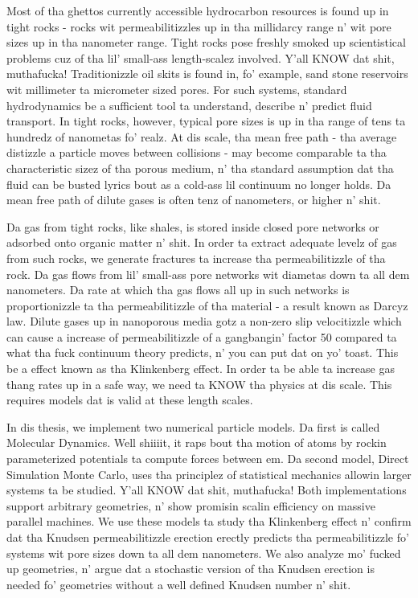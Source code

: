 Most of tha ghettos currently accessible hydrocarbon resources is found up in tight rocks - rocks wit permeabilitizzles up in tha millidarcy range n' wit pore sizes up in tha nanometer range. Tight rocks pose freshly smoked up scientistical problems cuz of tha lil' small-ass length-scalez involved. Y'all KNOW dat shit, muthafucka! Traditionizzle oil skits is found in, fo' example, sand stone reservoirs wit millimeter ta micrometer sized pores. For such systems, standard hydrodynamics be a sufficient tool ta understand, describe n' predict fluid transport. In tight rocks, however, typical pore sizes is up in tha range of tens ta hundredz of nanometas fo' realz. At dis scale, tha mean free path - tha average distizzle a particle moves between collisions - may become comparable ta tha characteristic sizez of tha porous medium, n' tha standard assumption dat tha fluid can be busted lyrics bout as a cold-ass lil continuum no longer holds. Da mean free path of dilute gases is often tenz of nanometers, or higher n' shit. 

Da gas from tight rocks, like shales, is stored inside closed pore networks or adsorbed onto organic matter n' shit. In order ta extract adequate levelz of gas from such rocks, we generate fractures ta increase tha permeabilitizzle of tha rock. Da gas flows from lil' small-ass pore networks wit diametas down ta all dem nanometers. Da rate at which tha gas flows all up in such networks is proportionizzle ta tha permeabilitizzle of tha material - a result known as Darcyz law. Dilute gases up in nanoporous media gotz a non-zero slip velocitizzle which can cause a increase of permeabilitizzle of a gangbangin' factor 50 compared ta what tha fuck continuum theory predicts, n' you can put dat on yo' toast. This be a effect known as tha Klinkenberg effect. In order ta be able ta increase gas thang rates up in a safe way, we need ta KNOW tha physics at dis scale. This requires models dat is valid at these length scales.

In dis thesis, we implement two numerical particle models. Da first is called Molecular Dynamics. Well shiiiit, it raps bout tha motion of atoms by rockin parameterized potentials ta compute forces between em. Da second model, Direct Simulation Monte Carlo, uses tha principlez of statistical mechanics allowin larger systems ta be studied. Y'all KNOW dat shit, muthafucka! Both implementations support arbitrary geometries, n' show promisin scalin efficiency on massive parallel machines. We use these models ta study tha Klinkenberg effect n' confirm dat tha Knudsen permeabilitizzle erection erectly predicts tha permeabilitizzle fo' systems wit pore sizes down ta all dem nanometers. We also analyze mo' fucked up geometries, n' argue dat a stochastic version of tha Knudsen erection is needed fo' geometries without a well defined Knudsen number n' shit. 

